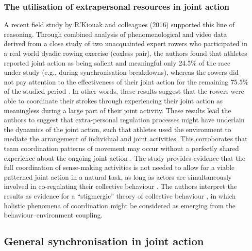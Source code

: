 \subsubsection{The utilisation of extrapersonal resources in joint action\label{sect:rowerStudy}}
A recent field study by R'Kiouak and colleagues (2016) supported this line of reasoning.  Through combined analysis of phenomenological and video data derived from a close study of two unacquainted expert rowers who participated in a real world dyadic rowing exercise (coxless pair), the authors found that athletes reported joint action as being salient and meaningful only 24.5\% of the race under study (e.g., during synchronisation breakdowns), whereas the rowers did not pay attention to the effectiveness of their joint action for the remaining 75.5\% of the studied period \citep{RKiouak2016}.  In other words, these results suggest that the rowers were able to coordinate their strokes through experiencing their joint action as meaningless during a large part of their joint activity.  These results lead the authors to suggest that extra-personal regulation processes might have underlain the dynamics of the joint action, such that athletes used the environment to mediate the arrangement of individual and joint activities. This corroborates that team coordination patterns of movement may occur without a perfectly shared experience about the ongoing joint action \citep{Bourbousson2011,Bourbousson2012}. The study provides evidence that the full coordination of sense-making activities is not needed to allow for a viable patterned joint action in a natural task, as long as actors are simultaneously involved in co-regulating their collective behaviour \citep{Froese2011,Froese2014}.
The authors interpret the results as evidence for a ``stigmergic'' theory of collective behaviour \citep{Susi2001,Avvenuti2013}, in which holistic phenomena of coordination might be considered as emerging from the behaviour–environment coupling.



















\subsection{General synchronisation in joint action\label{sect:generalSync}}
